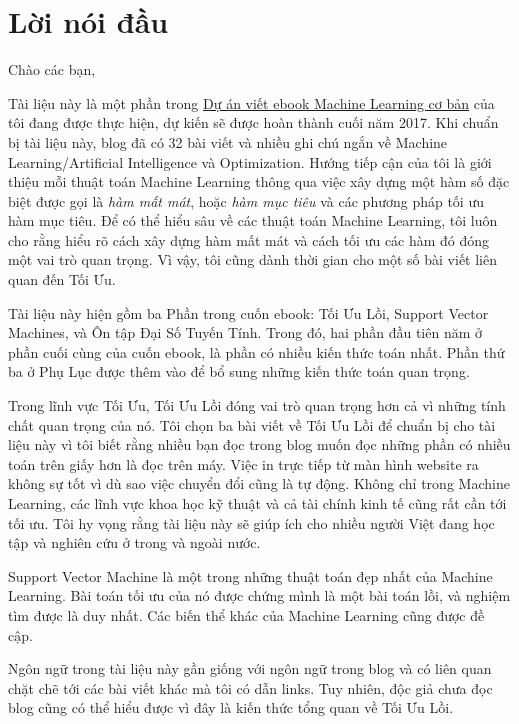\chapter{Lời nói đầu }
Chào các bạn,

Tài liệu này là một phần trong \href{https://machinelearningcoban.com/ebook}{Dự án viết ebook Machine Learning cơ bản} của tôi đang được thực hiện, dự kiến sẽ được hoàn thành cuối năm 2017. Khi chuẩn bị tài liệu này, blog đã có 32 bài viết và nhiều ghi chú ngắn về Machine Learning/Artificial Intelligence và Optimization. Hướng tiếp cận của tôi là giới thiệu mỗi thuật toán Machine Learning thông qua việc xây dựng một hàm số đặc biệt được gọi là \textit{hàm mất mát}, hoặc \textit{hàm mục tiêu} và các phương pháp tối ưu hàm mục tiêu. Để có thể hiểu sâu về các thuật toán Machine Learning, tôi luôn cho rằng hiểu rõ cách xây dựng hàm mất mát và cách tối ưu các hàm đó đóng một vai trò quan trọng. Vì vậy, tôi cũng dành thời gian cho một số bài viết liên quan đến Tối Ưu. 

Tài liệu này hiện gồm ba Phần trong cuốn ebook: Tối Ưu Lồi, Support Vector Machines, và Ôn tập Đại Số Tuyến Tính. Trong đó, hai phần đầu tiên năm ở phần cuối cùng của cuốn ebook, là phần có nhiều kiến thức toán nhất. Phần thứ ba ở Phụ Lục được thêm vào để bổ sung những kiến thức toán quan trọng.

Trong lĩnh vực Tối Ưu, Tối Ưu Lồi đóng vai trò quan trọng hơn cả vì những tính chất quan trọng của nó. Tôi chọn ba bài viết về Tối Ưu Lồi để chuẩn bị cho tài liệu này vì tôi biết rằng nhiều bạn đọc trong blog muốn đọc những phần có nhiều toán trên giấy hơn là đọc trên máy. Việc in trực tiếp từ màn hình website ra không sự tốt vì dù sao việc chuyển đổi cũng là tự động. Không chỉ trong Machine Learning, các lĩnh vực khoa học kỹ thuật và cả tài chính kinh tế cũng rất cần tới tối ưu. Tôi hy vọng rằng tài liệu này sẽ giúp ích cho nhiều người Việt đang học tập và nghiên cứu ở trong và ngoài nước. 

Support Vector Machine là một trong những thuật toán đẹp nhất của Machine Learning. Bài toán tối ưu của nó được chứng mình là một bài toán lồi, và nghiệm tìm được là duy nhất. Các biến thể khác của Machine Learning cũng được đề cập. 

Ngôn ngữ trong tài liệu này gần giống với ngôn ngữ trong blog và có liên quan chặt chẽ tới các bài viết khác mà tôi có dẫn links. Tuy nhiên, độc giả chưa đọc blog cũng có thể hiểu được vì đây là kiến thức tổng quan về Tối Ưu Lồi. 

